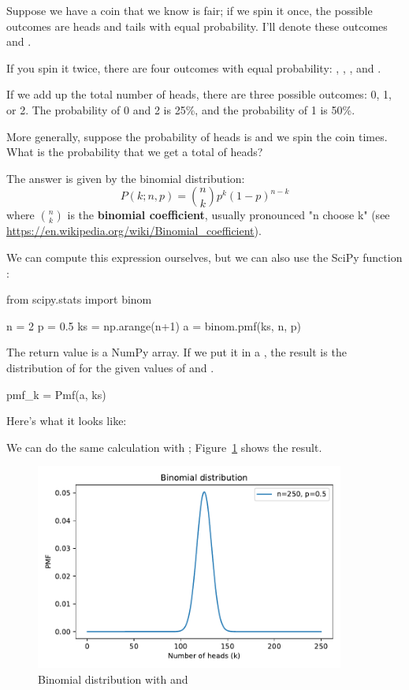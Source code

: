\documentclass[12pt]{book}
\theoremstyle{exercise}
\begin{document}
Suppose we have a coin that we know is fair; if we spin it once, the possible outcomes are heads and tails with equal probability.
I'll denote these outcomes  and .

If you spin it twice, there are four outcomes with equal probability: , , , and . 

If we add up the total number of heads, there are three possible outcomes: 0, 1, or 2.  The probability of 0 and 2 is 25\%, and the probability of 1 is 50\%.

More generally, suppose the probability of heads is  and we spin the coin  times.  What is the probability that we get a total of  heads?

The answer is given by the binomial distribution:
%
\[ P(k; n, p) = \binom{n}{k} p^k (1-p)^{n-k} \]
%
where $\binom{n}{k}$ is the {\bf binomial coefficient}, usually pronounced "n choose k" (see \url{https://en.wikipedia.org/wiki/Binomial_coefficient}).

We can compute this expression ourselves, but we can also use the SciPy function :

\begin{code}
from scipy.stats import binom

n = 2
p = 0.5
ks = np.arange(n+1)
a = binom.pmf(ks, n, p)
\end{code}

The return value is a NumPy array.
If we put it in a , the result is the distribution of  for the given values of  and .

\begin{code}
pmf_k = Pmf(a, ks)
\end{code}

Here's what it looks like:



We can do the same calculation with ; Figure~\ref{fig03-01} shows the result.

\begin{figure}
\centerline{\includegraphics[width=4in]{figs/fig03-01.pdf}}
\caption{Binomial distribution with  and }
\label{fig03-01}
\end{figure}
\end{document}

